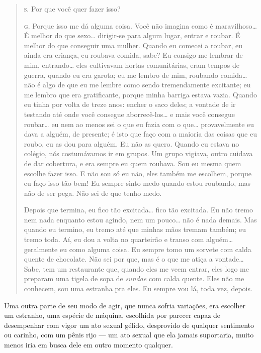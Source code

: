 \begin{quote}

\noindent\hskip0mm\textsc{s.} Por que você quer fazer isso?

\noindent\hskip0mm\textsc{g.} Porque isso me dá alguma coisa. Você não imagina como é
maravilhoso\ldots{} É melhor do que sexo\ldots{} dirigir-se para algum lugar,
entrar e roubar. É melhor do que conseguir uma mulher. Quando eu
comecei a roubar, eu ainda era criança, eu roubava comida, sabe? Eu
consigo me lembrar de mim, entrando\ldots{} eles cultivavam hortas
comunitárias, eram tempos de guerra, quando eu era garota; eu me lembro
de mim, roubando comida\ldots{} não é algo de que eu me lembre como sendo
tremendamente excitante; eu me lembro que era gratificante, porque
minha barriga estava vazia. Quando eu tinha por volta de treze anos:
encher o saco deles; a vontade de ir testando até onde você consegue
aborrecê-los\ldots{} e mais você consegue roubar\ldots{} eu nem ao menos sei o
que eu fazia com o que\ldots{} provavelmente eu dava a alguém, de presente;
é isto que faço com a maioria das coisas que eu roubo, eu as dou para
alguém. Eu não as quero. Quando eu estava no colégio, nós costumávamos
ir em grupos. Um grupo vigiava, outro cuidava de dar cobertura, e era
sempre eu quem roubava. Sou eu mesma quem escolhe fazer isso. E não sou
só eu não, eles também me escolhem, porque eu faço isso tão bem! Eu
sempre sinto medo quando estou roubando, mas não de ser pega. Não sei
de que tenho medo.

Depois que termina, eu fico tão excitada\ldots{} fico tão excitada. Eu
não tremo nem nada enquanto estou agindo, nem um pouco\ldots{} não é nada
demais. Mas quando eu termino, eu tremo até que minhas mãos tremam
também; eu tremo toda. Aí, eu dou a volta no quarteirão e transo com
alguém\ldots{} geralmente eu como alguma coisa. Eu sempre tomo um sorvete
com calda quente de chocolate. Não sei por que, mas é o que me atiça a
vontade\ldots{} Sabe, tem um restaurante que, quando eles me veem entrar,
eles logo me preparam uma tigela de sopa de \textit{sundae} com calda
quente. Eles não me conhecem, sou uma estranha pra eles. Eu sempre vou
lá, toda vez, depois.

\end{quote}

\bigskip

Uma outra parte de seu modo de agir, que nunca sofria variações, era
escolher um estranho, uma espécie de máquina, escolhida por parecer
capaz de desempenhar com vigor um ato sexual gélido, desprovido de
qualquer sentimento ou carinho, com um pênis rijo --- um ato sexual
que ela jamais suportaria, muito menos iria em busca dele em outro
momento qualquer.

